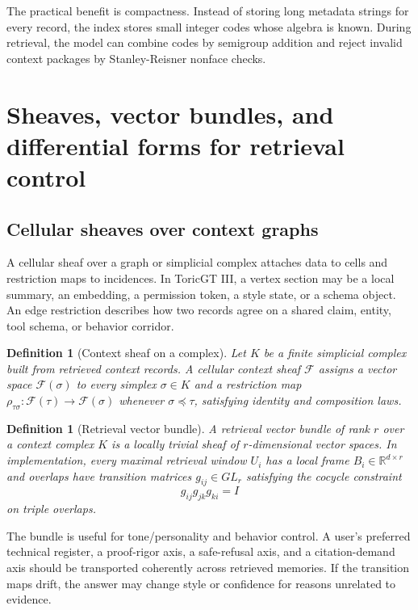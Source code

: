 \documentclass[11pt]{article}
\newtheorem{definition}[theorem]{Definition}
\newcommand{\RR}{\mathbb{R}}
\newcommand{\calF}{\mathcal{F}}
\numberwithin{equation}{section}
\begin{document}
The practical benefit is compactness. Instead of storing long metadata strings for every record, the index stores small integer codes whose algebra is known. During retrieval, the model can combine codes by semigroup addition and reject invalid context packages by Stanley-Reisner nonface checks.

\section{Sheaves, vector bundles, and differential forms for retrieval control}
\subsection{Cellular sheaves over context graphs}
A cellular sheaf over a graph or simplicial complex attaches data to cells and restriction maps to incidences. In ToricGT III, a vertex section may be a local summary, an embedding, a permission token, a style state, or a schema object. An edge restriction describes how two records agree on a shared claim, entity, tool schema, or behavior corridor.

\begin{definition}[Context sheaf on a complex]
Let $K$ be a finite simplicial complex built from retrieved context records. A cellular context sheaf $\calF$ assigns a vector space $\calF(\sigma)$ to every simplex $\sigma\in K$ and a restriction map $\rho_{\tau\sigma}:\calF(\tau)\to\calF(\sigma)$ whenever $\sigma\preceq\tau$, satisfying identity and composition laws.
\end{definition}

\begin{definition}[Retrieval vector bundle]
A retrieval vector bundle of rank $r$ over a context complex $K$ is a locally trivial sheaf of $r$-dimensional vector spaces. In implementation, every maximal retrieval window $U_i$ has a local frame $B_i\in\RR^{d\times r}$ and overlaps have transition matrices $g_{ij}\in GL_r$ satisfying the cocycle constraint
\begin{equation}
g_{ij}g_{jk}g_{ki}=I
\end{equation}
on triple overlaps.
\end{definition}

The bundle is useful for tone/personality and behavior control. A user's preferred technical register, a proof-rigor axis, a safe-refusal axis, and a citation-demand axis should be transported coherently across retrieved memories. If the transition maps drift, the answer may change style or confidence for reasons unrelated to evidence.
\end{document}
